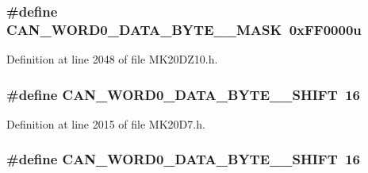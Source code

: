 \subsubsection[{\texorpdfstring{C\+A\+N\+\_\+\+W\+O\+R\+D0\+\_\+\+D\+A\+T\+A\+\_\+\+B\+Y\+T\+E\+\_\+1\+\_\+\+M\+A\+SK}{CAN_WORD0_DATA_BYTE_1_MASK}}]{\setlength{\rightskip}{0pt plus 5cm}\#define C\+A\+N\+\_\+\+W\+O\+R\+D0\+\_\+\+D\+A\+T\+A\+\_\+\+B\+Y\+T\+E\+\_\+\_\+\+M\+A\+SK~0x\+F\+F0000u}\hypertarget{group___c_a_n___register___masks_ga9e7f294cbdc5772dc2de56ec615eb695}{}\label{group___c_a_n___register___masks_ga9e7f294cbdc5772dc2de56ec615eb695}


Definition at line 2048 of file M\+K20\+D\+Z10.\+h.

\subsubsection[{\texorpdfstring{C\+A\+N\+\_\+\+W\+O\+R\+D0\+\_\+\+D\+A\+T\+A\+\_\+\+B\+Y\+T\+E\+\_\+1\+\_\+\+S\+H\+I\+FT}{CAN_WORD0_DATA_BYTE_1_SHIFT}}]{\setlength{\rightskip}{0pt plus 5cm}\#define C\+A\+N\+\_\+\+W\+O\+R\+D0\+\_\+\+D\+A\+T\+A\+\_\+\+B\+Y\+T\+E\+\_\+\_\+\+S\+H\+I\+FT~16}\hypertarget{group___c_a_n___register___masks_ga93129c7dd5f1db1583bf5110179d7a4e}{}\label{group___c_a_n___register___masks_ga93129c7dd5f1db1583bf5110179d7a4e}


Definition at line 2015 of file M\+K20\+D7.\+h.

\subsubsection[{\texorpdfstring{C\+A\+N\+\_\+\+W\+O\+R\+D0\+\_\+\+D\+A\+T\+A\+\_\+\+B\+Y\+T\+E\+\_\+1\+\_\+\+S\+H\+I\+FT}{CAN_WORD0_DATA_BYTE_1_SHIFT}}]{\setlength{\rightskip}{0pt plus 5cm}\#define C\+A\+N\+\_\+\+W\+O\+R\+D0\+\_\+\+D\+A\+T\+A\+\_\+\+B\+Y\+T\+E\+\_\+\_\+\+S\+H\+I\+FT~16}\hypertarget{group___c_a_n___register___masks_ga93129c7dd5f1db1583bf5110179d7a4e}{}\label{group___c_a_n___register___masks_ga93129c7dd5f1db1583bf5110179d7a4e}


